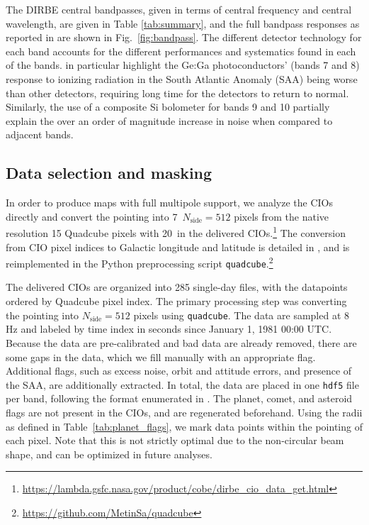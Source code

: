 \documentclass{aa}
\begin{document}
The DIRBE central bandpasses, given in terms of central frequency and central wavelength, are given in Table \ref{tab:summary}, and the full bandpass responses as reported in \citet{cobe_exsupp} are shown in Fig.~\ref{fig:bandpass}.
The different detector technology for each band accounts for the different performances and systematics found in each of the bands. \citet{silverberg93} in particular highlight the Ge:Ga photoconductors' (bands 7 and 8) response to ionizing radiation in the South Atlantic Anomaly (SAA) being worse than other detectors, requiring long time for the detectors to return to normal. Similarly, the use of a composite Si bolometer for bands 9 and 10 partially explain the over an order of magnitude increase in noise when compared to adjacent bands.

\subsection{Data selection and masking}
\label{sec:data_selection}

In order to produce maps with full multipole support, we analyze the CIOs directly and convert the pointing into 7\arcm\  $N_\mathrm{side}=512$ pixels from the native resolution 15 Quadcube pixels with 20\arcs\ in the delivered CIOs.\footnote{\url{https://lambda.gsfc.nasa.gov/product/cobe/dirbe\_cio\_data\_get.html}} The conversion from CIO pixel indices to Galactic longitude and latitude is detailed in \citet{cobe_exsupp}, and is reimplemented in the Python preprocessing script \texttt{quadcube}.\footnote{\url{https://github.com/MetinSa/quadcube}}

The delivered CIOs are organized into 285 single-day files, with the datapoints ordered by Quadcube pixel index. The primary processing step was converting the pointing into $N_\mathrm{side}=512$ pixels using \texttt{quadcube}. The data are sampled at 8\,Hz and labeled by time index in seconds since January 1, 1981 00:00 UTC. Because the data are pre-calibrated and bad data are already removed, there are some gaps in the data, which we fill manually with an appropriate flag. Additional flags, such as excess noise, orbit and attitude errors, and presence of the SAA, are additionally extracted. In total, the data are placed in one \texttt{hdf5} file per band, following the format enumerated in \citet{bp03}.
The planet, comet, and asteroid flags are not present in the CIOs, and are regenerated beforehand. Using the radii as defined in Table~\ref{tab:planet_flags}, we mark data points within the pointing of each pixel. Note that this is not strictly optimal due to the non-circular beam shape, and can be optimized in future analyses.
\end{document}
